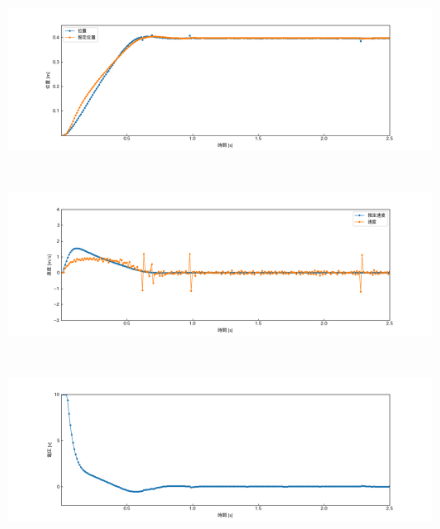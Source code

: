 \documentclass[12pt]{jsarticle}
\begin{document}
\begin{figure}[H]
  \begin{center}
    \includegraphics[clip,width=13.0cm, height=4.4cm]{../img/Exp1-1.png}
    \caption{}
    \label{Exp1-1}
  \end{center}
\end{figure}
\begin{figure}[H]
  \begin{center}
    \includegraphics[clip,width=13.0cm, height=4.4cm]{../img/Exp1-2.png}
    \caption{}
    \label{Exp1-2}
  \end{center}
\end{figure}
\begin{figure}[H]
  \begin{center}
    \includegraphics[clip,width=13.0cm, height=4.4cm]{../img/Exp1-3.png}
    \caption{}
    \label{Exp1-3}
  \end{center}
\end{figure}
\end{document}
